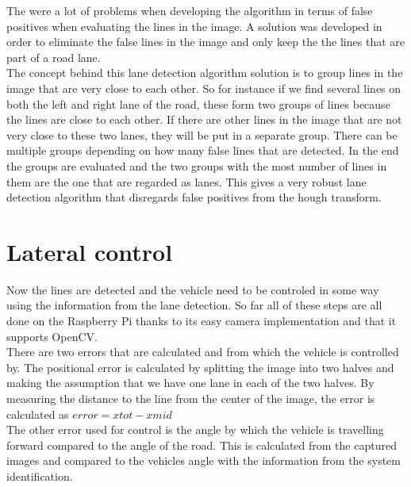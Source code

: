 The were a lot of problems when developing the algorithm in terms of false positives when evaluating the lines in the image. A solution was developed in order to eliminate the false lines in the image and only keep the the lines that are part of a road lane.\\

The concept behind this lane detection algorithm solution is to group lines in the image that are very close to each other. So for instance if we find several lines on both the left and right lane of the road, these form two groups of lines because the lines are close to each other. If there are other lines in the image that are not very close to these two lanes, they will be put in a separate group. There can be multiple groups depending on how many false lines that are detected. In the end the groups are evaluated and the two groups with the most number of lines in them are the one that are regarded as lanes. This gives a very robust lane detection algorithm that disregards false positives from the hough transform. 



\section{Lateral control}
Now the lines are detected and the vehicle need to be controled in some way using the information from the lane detection. So far all of these steps are all done on the Raspberry Pi thanks to its easy camera implementation and that it supports OpenCV.\\

There are two errors that are calculated and from which the vehicle is controlled by. The positional error is calculated by splitting the image into two halves and making the assumption that we have one lane in each of the two halves. By measuring the distance to the line from the center of the image, the error is calculated as $error = xtot - xmid$\\

The other error used for control is the angle by which the vehicle is travelling forward compared to the angle of the road. This is calculated from the captured images and compared to the vehicles angle with the information from the system identification.\\

